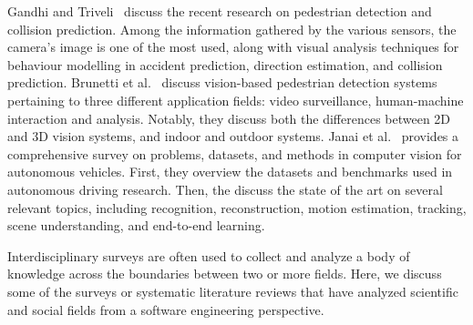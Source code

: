 Gandhi and Triveli~\cite{1706871} discuss the recent 
research on pedestrian detection and collision 
prediction. Among the information gathered by 
the various sensors, the camera's image is one 
of the most used, along with visual analysis 
techniques for behaviour modelling in accident 
prediction, direction estimation, and collision prediction. 
%
Brunetti et al.~\cite{BRUNETTI201817} discuss 
vision-based pedestrian detection systems pertaining 
to three different application fields: video 
surveillance, human-machine interaction and 
analysis. Notably, they discuss both the 
differences between 2D and 3D vision systems, 
and indoor and outdoor systems.
%
Janai et al.~\cite{DBLP:journals/corr/JanaiGBG17} 
provides a comprehensive survey on problems, 
datasets, and methods in computer vision for 
autonomous vehicles. First, they overview the 
datasets and benchmarks used in autonomous 
driving research. Then, the discuss the state 
of the art on several relevant topics, 
including recognition, reconstruction, motion 
estimation, tracking, scene understanding, and 
end-to-end learning.

Interdisciplinary surveys are often used to collect 
and analyze a body of knowledge across the boundaries 
between two or more fields. 
Here, we discuss some of the 
surveys or systematic literature reviews that have analyzed scientific and social 
fields from a software engineering perspective. 

